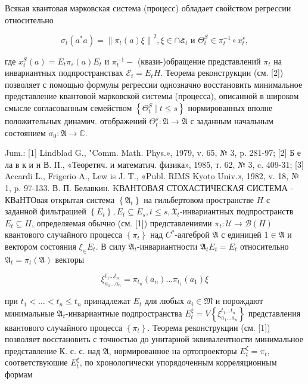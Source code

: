 \documentclass[10pt]{article}
\begin{document}
Всякая квантовая марковская система (процесс) обладает свойством регрессии относительно



\[

\sigma_{t}\left(a^{*} a\right)=\left\|\pi_{t}(a) \xi\right\|^{2}, \xi \in \cap ๕_{t} \text { и } \Theta_{t}^{S} \in \pi_{t}^{-1} \circ x_{t}^{s},

\]



где $x_{t}^{S}(a)=E_{t} \pi_{s}(a) E_{t}$ и $\pi_{t}^{-1}-$ (квази-)обращение представлений $\pi_{t}$ на инвариантных подпространствах $\mathscr{E}_{t}=E_{t} H$. Теорема реконструкции (см. [2]) позволяет с помощью формулы регрессии однозначно восстановить минимальное представление квантовой марковской системы (процесса), описанной в широком смысле согласованным семейством $\left\{\Theta_{t}^{S} \mid t \leqslant s\right\}$ нормированных вполне положительных динамич. отображений $\Theta_{t}^{s}: \mathfrak{A} \rightarrow \mathfrak{A}$ с заданным начальным состоянием $\sigma_{0}: \mathfrak{A} \rightarrow \mathbb{C}$.



Jum.: [1] Lindblad G., "Comm. Math. Phys.», 1979, v. 65, № 3, p. 281-97; [2] Б е ла в к и н В. П., «Теоретич. и математич. физика», 1985, т. 62, № 3, c. 409-31; [3] Accardi L., Frigerio A., Lew is J. T., «Publ. RIMS Kyoto Univ.», 1982, v. 18, № 1, p. 97-133. В. П. Белавкин. KВАНТОВАЯ СТОХАСТИЧЕСКАЯ СИСТЕМА - КВаНТОвая открытая система $\left\{\mathfrak{A}_{t}\right\}$ на гильбертовом пространстве $H$ с заданной фильтрацией $\left\{E_{t}\right\}, E_{t} \subseteq E_{s}, t \leqslant s, \mathfrak{X}_{t}$-инвариантных подпространств $E_{t} \subseteq H$, определяемая обычно (см. [1]) представлениями $\pi_{t}: \mathscr{U} \rightarrow \mathscr{B}(H)$ квантового случайного процесса $\left\{\pi_{t}\right\}$ над $C^{*}$-алгеброй $\mathfrak{A}$ с единицей $1 \in \mathfrak{A}$ и вектором состояния $\xi_{\in} E_{t}$. В силу $\mathfrak{A}_{t}$-инвариантности $\mathfrak{A}_{t} E_{t}=E_{t}$ относительно $\mathfrak{A}_{t}=\pi_{t}(\mathfrak{A})$ векторы



\[

\xi_{a_{1} \ldots a_{n}}^{t_{1} \ldots t_{n}}=\pi_{t_{n}}\left(a_{n}\right) \ldots \pi_{t_{1}}\left(a_{1}\right) \xi

\]



при $t_{1}<\ldots<t_{n} \leqslant t_{n}$ принадлежат $E_{t}$ для любых $a_{i} \in \mathfrak{M}$ и порождают минимальные $\mathfrak{A}_{t}$-инвариантные подпространства $E_{t}^{\xi}=V\left\{\xi_{a_{1} \ldots a_{n}}^{t_{1} \ldots t_{n}}\right\}$ представления квантового случайного процесса $\left\{\pi_{t}\right\}$. Теорема реконструкции (см. [1]) позволяет восстановить с точностью до унитарной эквивалентности минимальное представление К. с. с. над $\mathfrak{A}$, нормированное на ортопроекторы $E_{t}^{\xi}=\pi_{t}$, соответствуюшие $E_{t}^{\xi}$, по хронологически упорядоченным корреляционным формам
\end{document}
